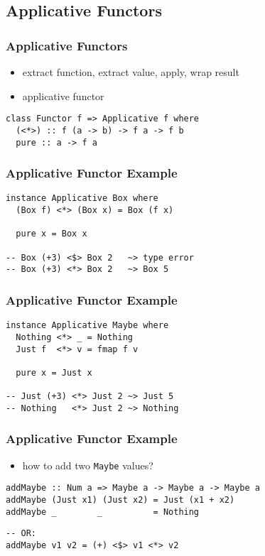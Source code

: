 \documentclass[dvipsnames]{beamer}
\theoremstyle{plain}
\begin{document}
\subsection{Applicative Functors}

\begin{frame}[fragile]
  \frametitle{Applicative Functors}

  \begin{itemize}
    \item extract function, extract value, apply, wrap result
    \item \alert{applicative functor}
  \end{itemize}

  \begin{lstlisting}
class Functor f => Applicative f where
  (<*>) :: f (a -> b) -> f a -> f b
  pure :: a -> f a
  \end{lstlisting}
\end{frame}

\begin{frame}[fragile]
  \frametitle{Applicative Functor Example}

  \begin{lstlisting}
instance Applicative Box where
  (Box f) <*> (Box x) = Box (f x)

  pure x = Box x

-- Box (+3) <$> Box 2   ~> type error
-- Box (+3) <*> Box 2   ~> Box 5
  \end{lstlisting}
\end{frame}

\begin{frame}[fragile]
  \frametitle{Applicative Functor Example}

  \begin{lstlisting}
instance Applicative Maybe where
  Nothing <*> _ = Nothing
  Just f  <*> v = fmap f v

  pure x = Just x

-- Just (+3) <*> Just 2 ~> Just 5
-- Nothing   <*> Just 2 ~> Nothing
  \end{lstlisting}
\end{frame}

\begin{frame}[fragile]
  \frametitle{Applicative Functor Example}

  \begin{itemize}
    \item how to add two \lstinline|Maybe| values?
  \end{itemize}

  \pause
  \medskip
  \begin{lstlisting}
addMaybe :: Num a => Maybe a -> Maybe a -> Maybe a
addMaybe (Just x1) (Just x2) = Just (x1 + x2)
addMaybe _        _          = Nothing
  \end{lstlisting}

  \pause
  \begin{lstlisting}
-- OR:
addMaybe v1 v2 = (+) <$> v1 <*> v2
  \end{lstlisting}
\end{frame}
\end{document}
